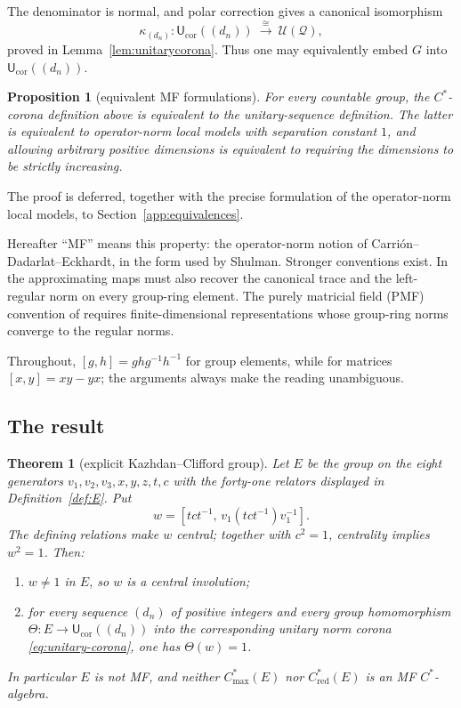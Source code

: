 \documentclass[11pt]{amsart}
\newcommand{\leanverified}[2]{\ignorespaces}
\newtheorem{proposition}[theorem]{Proposition}
\theoremstyle{definition}
\theoremstyle{remark}
\theoremstyle{plain}
\newtheorem{mainthm}{Theorem}
\newcommand{\U}{\mathcal U}
\newcommand{\Ucor}{\mathsf U_{\mathrm{cor}}}
\newcommand{\Cmax}{C^*_{\mathrm{max}}}
\newcommand{\Cred}{C^*_{\mathrm{red}}}
\begin{document}
The denominator is normal, and polar correction gives a canonical
isomorphism
\begin{equation}\label{eq:unitary-corona-iso}
 \kappa_{(d_n)}\colon \Ucor((d_n))\ \xrightarrow{\ \cong\ }\
 \U(\mathcal Q),
\end{equation}
proved in Lemma~\ref{lem:unitarycorona}.  Thus one may equivalently embed
$G$ into $\Ucor((d_n))$.
\begin{proposition}[equivalent MF formulations]
\label{prop:mf-equivalences}
For every countable group, the $C^*$-corona definition above is
equivalent to the unitary-sequence definition.  The latter is equivalent to
operator-norm local models with separation constant $1$, and allowing
arbitrary positive dimensions is equivalent to requiring the dimensions to
be strictly increasing.
\leanverified{Sofic/ManuscriptExactWrappers}{GroupApproximation.ManuscriptExactWrappers.manuscriptMFDefinitionEquivalences}
\end{proposition}

The proof is deferred, together with the precise formulation of the
operator-norm local models, to Section~\ref{app:equivalences}.

Hereafter ``MF'' means this property: the operator-norm notion of
Carri\'on--Dadarlat--Eckhardt, in the form used by Shulman.  Stronger
conventions exist.
In \cite{GKEMP} the approximating maps must also recover the canonical
trace and the left-regular norm on every group-ring element.  The
purely matricial field (PMF) convention of \cite[Definition~1.2]{MdlS}
requires finite-dimensional representations whose group-ring norms
converge to the regular norms.

Throughout, $[g,h]=ghg^{-1}h^{-1}$ for group elements, while for matrices
$[x,y]=xy-yx$; the arguments always make the reading unambiguous.
\subsection*{The result}

\begin{mainthm}[explicit Kazhdan--Clifford group]\label{thm:A}
Let $E$ be the group on the eight generators
$v_1,v_2,v_3,x,y,z,t,c$ with the forty-one relators displayed in
Definition~\ref{def:E}.  Put
\[
 w=[tct^{-1},\,v_1(tct^{-1})v_1^{-1}].
\]
The defining relations make $w$ central; together with $c^2=1$, centrality
implies $w^2=1$.  Then:
\begin{enumerate}
  \item $w\neq 1$ in $E$, so $w$ is a central involution;
  \item for every sequence $(d_n)$ of positive integers and every group homomorphism
    $\Theta\colon E\to\Ucor((d_n))$ into the corresponding unitary norm
    corona \eqref{eq:unitary-corona}, one has $\Theta(w)=1$.
\end{enumerate}
In particular $E$ is not MF, and neither $\Cmax(E)$ nor $\Cred(E)$ is an
MF $C^*$-algebra.
\leanverified{Sofic/LiteralNonMFEndpoint}{GroupApproximation.LiteralNonMFEndpoint.manuscriptTheoremA}
\end{mainthm}
\end{document}

